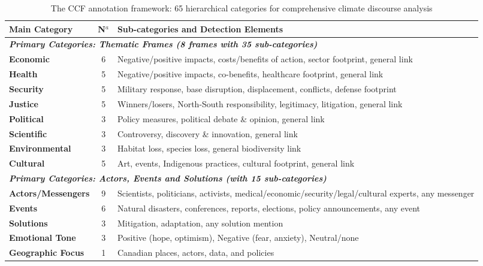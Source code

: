 \documentclass[12pt]{article}
\begin{document}
\begin{table}[!ht]
\centering
\caption{The CCF annotation framework: 65 hierarchical categories for comprehensive climate discourse analysis}
\label{tab:framework_summary}
\footnotesize
\begin{tabularx}{\textwidth}{lcX}
\toprule
\rowcolor{gray!15}
\textbf{Main Category} & \textbf{N}$^a$ & \textbf{Sub-categories and Detection Elements} \\
\midrule
\multicolumn{3}{l}{\cellcolor{gray!10}\textbf{\textit{Primary Categories: Thematic Frames (8 frames with 35 sub-categories)}}} \\
\midrule
\textbf{Economic} & 6 & Negative/positive impacts, costs/benefits of action, sector footprint, general link \\
\textbf{Health} & 5 & Negative/positive impacts, co-benefits, healthcare footprint, general link \\
\textbf{Security} & 5 & Military response, base disruption, displacement, conflicts, defense footprint \\
\textbf{Justice} & 5 & Winners/losers, North-South responsibility, legitimacy, litigation, general link \\
\textbf{Political} & 3 & Policy measures, political debate \& opinion, general link \\
\textbf{Scientific} & 3 & Controversy, discovery \& innovation, general link \\
\textbf{Environmental} & 3 & Habitat loss, species loss, general biodiversity link \\
\textbf{Cultural} & 5 & Art, events, Indigenous practices, cultural footprint, general link \\
\midrule
\multicolumn{3}{l}{\cellcolor{gray!10}\textbf{\textit{Primary Categories: Actors, Events and Solutions (with 15 sub-categories)}}} \\
\midrule
\textbf{Actors/Messengers} & 9 & Scientists, politicians, activists, medical/economic/security/legal/cultural experts, any messenger \\
\textbf{Events} & 6 & Natural disasters, conferences, reports, elections, policy announcements, any event \\
\textbf{Solutions} & 3 & Mitigation, adaptation, any solution mention \\
\midrule
\cellcolor{gray!10}\textbf{Emotional Tone} & \cellcolor{gray!10}3 & \cellcolor{gray!10}Positive (hope, optimism), Negative (fear, anxiety), Neutral/none \\
\midrule
\cellcolor{gray!10}\textbf{Geographic Focus} & \cellcolor{gray!10}1 & \cellcolor{gray!10}Canadian places, actors, data, and policies \\

\end{tabularx}
\end{table}
\end{document}
